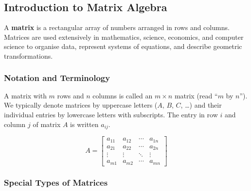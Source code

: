 
\subsection{Introduction to Matrix Algebra}

A \textbf{matrix} is a rectangular array of numbers arranged in rows and columns. Matrices are used extensively in mathematics, science, economics, and computer science to organise data, represent systems of equations, and describe geometric transformations.

\subsubsection*{Notation and Terminology}

A matrix with $m$ rows and $n$ columns is called an $m \times n$ matrix (read ``$m$ by $n$''). We typically denote matrices by uppercase letters ($A$, $B$, $C$, \ldots) and their individual entries by lowercase letters with subscripts. The entry in row $i$ and column $j$ of matrix $A$ is written $a_{ij}$.

\[
A = \begin{bmatrix} a_{11} & a_{12} & \cdots & a_{1n} \\ a_{21} & a_{22} & \cdots & a_{2n} \\ \vdots & \vdots & \ddots & \vdots \\ a_{m1} & a_{m2} & \cdots & a_{mn} \end{bmatrix}
\]

\subsubsection*{Special Types of Matrices}

